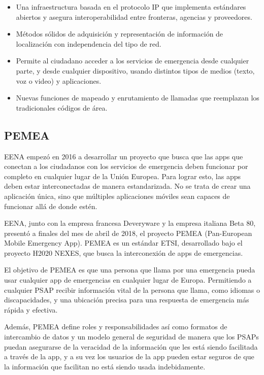 \begin{itemize}
  \item Una infraestructura basada en el protocolo IP que implementa estándares abiertos y asegura interoperabilidad entre fronteras, agencias y proveedores.
  \item Métodos sólidos de adquisición y representación de información de localización con independencia del tipo de red.
  \item Permite al ciudadano acceder a los servicios de emergencia desde cualquier parte, y desde cualquier dispositivo, usando distintos tipos de medios (texto, voz o video) y aplicaciones.
  \item Nuevas funciones de mapeado y enrutamiento de llamadas que reemplazan los tradicionales códigos de área.
\end{itemize}

\subsection{PEMEA}

EENA empezó en 2016 a desarrollar un proyecto que busca que las apps que conectan a los ciudadanos con los servicios de emergencia deben funcionar por completo en cualquier lugar de la Unión Europea. Para lograr esto, las apps deben estar interconectadas de manera estandarizada. No se trata de crear una aplicación única, sino que múltiples aplicaciones móviles sean capaces de funcionar allá de donde estén.

EENA, junto con la empresa francesa Deveryware y la empresa italiana Beta 80, presentó a finales del mes de abril de 2018, el proyecto PEMEA (Pan-European Mobile Emergency App). PEMEA es un estándar ETSI, desarrollado bajo el proyecto H2020 NEXES, que busca la interconexión de apps de emergencias.

El objetivo de PEMEA es que una persona que llama por una emergencia pueda usar cualquier app de emergencias en cualquier lugar de Europa. Permitiendo a cualquier PSAP recibir información vital de la persona que llama, como idiomas o discapacidades, y una ubicación precisa para una respuesta de emergencia más rápida y efectiva.

Además, PEMEA define roles y responsabilidades así como formatos de intercambio de datos y un modelo general de seguridad de manera que los PSAPs puedan asegurarse de la veracidad de la información que les está siendo facilitada a través de la app, y a su vez los usuarios de la app pueden estar seguros de que la información que facilitan no está siendo usada indebidamente.

